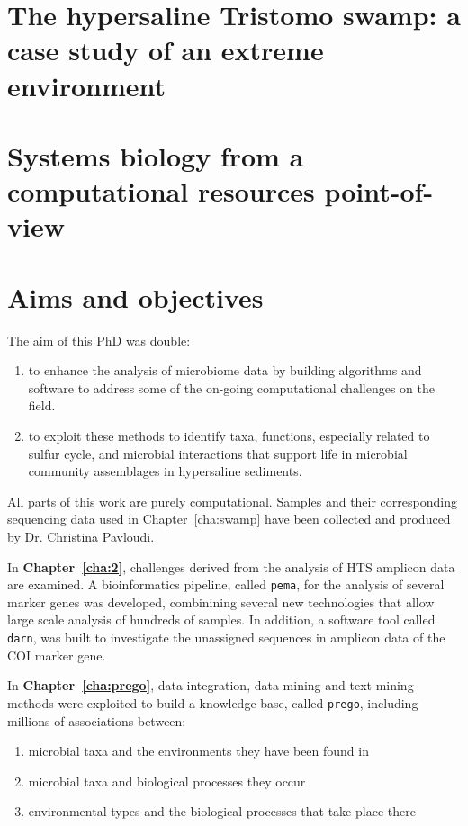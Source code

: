 \section{The hypersaline Tristomo swamp: a case study of an extreme environment}


\section{Systems biology from a computational resources point-of-view}





\section{Aims and objectives}

   The aim of this PhD was double:
   \begin{enumerate}
      \item to enhance the analysis of microbiome data by building algorithms and software 
            to address some of the on-going computational challenges on the field.
      \item to exploit these methods to identify taxa, functions, especially related to sulfur cycle, 
            and microbial interactions that support life in microbial community assemblages in hypersaline sediments.
   \end{enumerate}
   All parts of this work are purely computational. 
   Samples and their corresponding sequencing data used in Chapter~\ref{cha:swamp} have been collected 
   and produced by \href{https://scholar.google.com/citations?user=3zs1rNkAAAAJ&hl=en&oi=sra}{Dr. Christina Pavloudi}. 

   In \textbf{Chapter~\ref{cha:2}}, challenges derived from the analysis of HTS amplicon data are examined.
   A bioinformatics pipeline, called \texttt{pema}, for the analysis of several marker genes was developed, combinining several new technologies that allow large scale analysis of hundreds of samples. 
   In addition, a software tool called \texttt{darn}, was built to investigate the unassigned sequences in amplicon data of the COI marker gene. 

   In \textbf{Chapter~\ref{cha:prego}}, data integration, data mining and text-mining methods were exploited to build a knowledge-base, called \texttt{prego}, including millions of associations between:
   \begin{enumerate}
      \item microbial taxa and the environments they have been found in 
      \item microbial taxa and biological processes they occur
      \item environmental types and the biological processes that take place there
   \end{enumerate}

